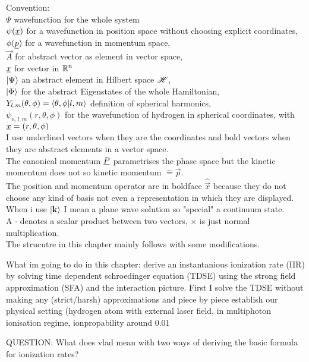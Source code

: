 Convention: \\
$\Psi$ wavefunction for the whole system  \\
$\psi(\underline{x})$ for a wavefunction in position space without choosing explicit coordinates, \\
$\phi(\underline{p})$  for a wavefunction in momentum space, \\
$\vec{A}$ for abstract vector as element in vector space, \\
$\underline{x}$ for vector in $\mathbb{R}^n$ \\
$\ket{\Psi}$ an abstract element in Hilbert space $\mathscr{H}$, \\
$\ket{\Phi}$ for the abstract Eigenstates of the whole Hamiltonian, \\
$Y_{l, m}(\theta, \phi) = \braket{\theta, \phi | l, m}$ definition of spherical harmonics, \\
$\psi_{n, l, m}(r, \theta, \phi)$ for the wavefunction of hydrogen in spherical coordinates, with $\underline{x}=(r, \theta, \phi)$ \\
I use underlined vectors when they are the coordinates and bold vectors when they are abstract elements in a vector space. \\
The canonical momentum $\underline{P}$ parametrises the phase space but the kinetic momentum does not so kinetic momentum $\hat{=} \vec{p}$.\\
The position and momentum operator are in boldface $\hat{\vec{x}}$ because they do not choose any kind of basis not even a representation in which they are displayed.\\
When i use $\ket{\mathbf{k}}$ I mean a plane wave solution so "special" a continuum state.\\
A $\cdot$ denotes a scalar product between two vectors, $\times$ is just normal multiplication. \\


The strucutre in this chapter mainly follows \cite{Ivanov20012005} with some modifications.

What im going to do in this chapter: derive an instantanious ionization rate (IIR) by solving time dependent schroedinger equation (TDSE) using the strong field approximation (SFA) and the interaction picture.
First I solve the TDSE without making any (strict/harsh) approximations and piece by piece establish our physical setting (hydrogen atom with external laser field, in multiphoton ionisation regime, ionpropability around 0.01%

QUESTION: What does vlad mean with two ways of deriving the basic formula for ionization rates?



